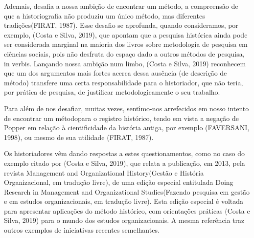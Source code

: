 \documentclass[
12pt,		%
openright,	%
twoside,  %
a4paper,			%
chapter=TITLE,		%
english,			%
french,				%
spanish,			%
brazil				%
]{USPSC-classe/USPSC}
\begin{document}
Ademais, desafia a nossa ambi\c{c}\~ao de \textquotedbl encontrar um m\'etodo\textquotedbl , a compreens\~ao de que a \textquotedbl historiografia n\~ao produziu um \'unico m\'etodo, mas diferentes tradi\c{c}\~oes\textquotedbl  (FIRAT, 1987).  Esse desafio se aprofunda, quando consideramos, por exemplo, (Costa e Silva, 2019), que apontam que a \textquotedbl pesquisa hist\'orica ainda pode ser considerada marginal na maioria dos livros sobre metodologia de pesquisa em ci\^encias sociais, pois n\~ao desfruta do espa\c{c}o dado a outros m\'etodos de pesquisa\textquotedbl , in verbis. Lan\c{c}ando nossa ambi\c{c}\~ao num limbo,  (Costa e Silva, 2019) reconhecem \textquotedbl que um dos argumentos mais fortes acerca dessa aus\^encia (de descri\c{c}\~ao de m\'etodo) transfere uma certa responsabilidade para o historiador, que n\~ao teria, por pr\'atica de pesquisa, de justificar metodologicamente o seu trabalho\textquotedbl .

















Para al\'em de nos desafiar, muitas vezes, sent\'{\i}mo-nos arrefecidos em nosso intento de \textquotedbl encontrar um m\'etodo\textquotedbl  para o registro hist\'orico, tendo em vista a nega\c{c}\~ao de Popper em rela\c{c}\~ao \`a cientificidade da hist\'oria antiga, por exemplo (FAVERSANI, 1998), ou mesmo de sua utilidade (FIRAT, 1987).

















Os historiadores v\^em dando respostas a estes questionamentos, como no caso do exemplo citado por  (Costa e Silva, 2019), que relata a publica\c{c}\~ao, em 2013, pela revista \textquotedbl Management and Organizational History\textquotedbl  (\textquotedbl Gest\~ao e Hist\'oria Organizacional\textquotedbl , em tradu\c{c}\~ao livre), de uma edi\c{c}\~ao especial entitulada \textquotedbl Doing Research in Management and Organizational Studies\textquotedbl  (Fazendo pesquisa em gest\~ao e em estudos organizacionais\textquotedbl , em tradu\c{c}\~ao livre). Esta edi\c{c}\~ao especial \'e voltada para apresentar aplica\c{c}\~oes do m\'etodo hist\'orico, com orienta\c{c}\~oes pr\'aticas (Costa e Silva, 2019) para o mundo dos estudos organizacionais. A mesma refer\^encia traz outros exemplos de iniciativas recentes semelhantes.
\end{document}
